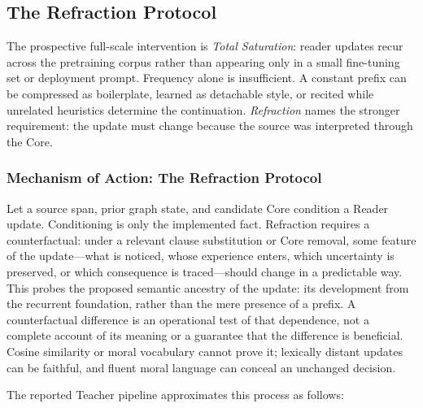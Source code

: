 \subsection{The Refraction Protocol}

The prospective full-scale intervention is \emph{Total Saturation}: reader
updates recur across the pretraining corpus rather than appearing only in a
small fine-tuning set or deployment prompt. Frequency alone is insufficient.
A constant prefix can be compressed as boilerplate, learned as detachable
style, or recited while unrelated heuristics determine the continuation.
\emph{Refraction} names the stronger requirement: the update must change because
the source was interpreted through the Core.

\subsubsection{Mechanism of Action: The Refraction Protocol}\label{sec:refraction-protocol}

Let a source span, prior graph state, and candidate Core condition a Reader
update. Conditioning is only the implemented fact. Refraction requires a
counterfactual: under a relevant clause substitution or Core removal, some
feature of the update---what is noticed, whose experience enters, which
uncertainty is preserved, or which consequence is traced---should change in a
predictable way. This probes the proposed semantic ancestry of the update:
its development from the recurrent foundation, rather than the mere
presence of a prefix. A counterfactual difference is an operational test
of that dependence, not a complete account of its meaning or a guarantee
that the difference is beneficial. Cosine similarity or moral vocabulary
cannot prove it; lexically distant updates can be faithful, and fluent
moral language can conceal an unchanged decision.

The reported Teacher pipeline approximates this process as follows:

